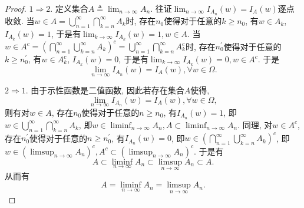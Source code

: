 \documentclass[UTF8, a4paper]{article}
\begin{document}
\begin{proof}
\(1 \Rightarrow 2\). 定义集合\(A \triangleq \lim_{n\to \infty} A_n\). 往证\(\lim_{n\to \infty} I_{A_n}(w) = I_A(w)\)逐点收敛.
当\(w \in A = \bigcup_{n=1}^\infty \bigcap_{k=n}^\infty A_k \)时, 
存在\(n_0\)使得对于任意的\(k \geq n_0\), 有\(w \in  A_k\), \(I_{A_k}(w) = 1\), 于是有\(\lim_{k\to\infty}I_{A_k}(w) = 1, w\in A\). 
当\(w\in A^c= \left(\bigcap_{n=1}^\infty \bigcup_{k=n}^\infty A_k\right)^c = \bigcup_{n=1}^\infty \bigcap_{k=n}^\infty A_k^c\)时, 
存在\(n_0^\prime\)使得对于任意的\(k \geq n_0^\prime\), 有\(w \in  A_k^c\), \(I_{A_k}(w) = 0\), 于是有\(\lim_{k\to\infty}I_{A_k}(w) = 0, w\in A^c\). 于是
$$\lim_{n\to \infty} I_{A_n}(w) = I_A(w), \forall w \in \Omega.$$

\(2 \Rightarrow 1\). 
由于示性函数是二值函数, 因此若存在集合\(A\)使得, $$\lim_{n\to \infty} I_{A_n}(w) = I_A(w), \forall w \in \Omega, $$
则有对\(w \in A\), 存在\(n_0\)使得对于任意的\(n \geq n_0\), 有\(I_{A_n}(w) = 1\), 即\(w \in \bigcup_{n=1}^\infty \bigcap_{k=n}^\infty A_k\), 即\(w \in \liminf_{n\to \infty} A_n, A \subset \liminf_{n\to \infty} A_n\).
同理, 对\(w \in A^c\), 存在\(n_0^\prime\)使得对于任意的\(n \geq n_0^\prime\), 有\(I_{A_n}(w) = 0\), 即\(w \in \left(\bigcap_{n=1}^\infty \bigcup_{k=n}^\infty A_k\right)^c\), 即\(w \in \left(\limsup_{n\to \infty} A_n\right)^c, A^c \subset \left(\limsup_{n\to \infty} A_n\right)^c\). 于是有
$$
A \subset \liminf_{n\to \infty} A_n \subset \limsup_{n\to \infty} A_n \subset A.
$$
从而有
$$
A = \liminf_{n\rightarrow \infty} A_n = \limsup_{n\rightarrow \infty} A_n.
$$
\end{proof}





\medskip

\printbibliography
\end{document}
